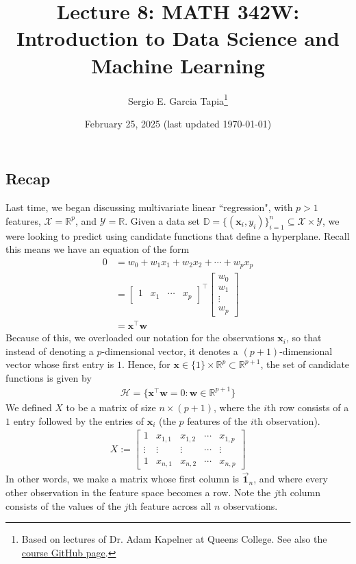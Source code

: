 \documentclass[12pt, a4paper]{article}
\title{Lecture 8: MATH 342W: Introduction to Data Science and Machine Learning}
\author{Sergio E. Garcia Tapia\thanks{Based on lectures of Dr. Adam Kapelner at Queens College.
See also the \href{https://github.com/kapelner/QC_MATH_342W_Spring_2025}{course GitHub page}.}}
\date{February 25, 2025 (last updated \today)}
\theoremstyle{definition}
\begin{document}
	\maketitle
	\subsection*{Recap}
	Last time, we began discussing multivariate linear ``regression", with
	$p>1$ features, $\mathcal{X}=\mathbb{R}^p$, and $\mathcal{Y}=\mathbb{R}$.
	Given a data set $\mathbb{D}=\{(\mathbf{x}_i, y_i)\}_{i=1}^{n}\subseteq \mathcal{X}\times \mathcal{Y}$,
	we were looking to predict using candidate functions that define a hyperplane. Recall this
	means we have an equation of the form
	\begin{align*}
		0&=w_0+w_1x_1+w_2x_2+\cdots+w_px_p\\
		 &= \begin{bmatrix}
			1 & x_1 & \cdots & x_p
		\end{bmatrix}^\top
		\begin{bmatrix}
			w_0 \\
			w_1\\
			\vdots\\
			w_p
		\end{bmatrix}\\
		&= \mathbf{x}^\top \mathbf{w}
	\end{align*}
	Because of this, we overloaded our notation for the observations $\mathbf{x}_i$, so that
	instead of denoting a $p$-dimensional vector, it denotes a $(p+1)$-dimensional vector
	whose first entry is $1$. Hence, for $\mathbf{x}\in \{1\}\times \mathbb{R}^{p}\subset \mathbb{R}^{p+1}$,
	the set of candidate functions is given by
	\begin{align*}
		\mathcal{H} = \{\mathbf{x}^\top \mathbf{w}=0: \mathbf{w}\in\mathbb{R}^{p+1}\}
	\end{align*}
	We defined $X$ to be a matrix of size $n\times (p+1)$, where the $i$th row consists
	of a $1$ entry followed by the entries of $\mathbf{x}_i$ (the $p$ features of the
	$i$th observation).
	\begin{align*}
		X := \begin{bmatrix}
			1 & x_{1,1} & x_{1, 2} & \cdots & x_{1, p}\\
			\vdots & \vdots & \vdots & \cdots & \vdots\\
			1 & x_{n, 1} & x_{n, 2} & \cdots& x_{n, p}
		\end{bmatrix}
	\end{align*}
	In other words, we make a matrix whose first column is $\vec{\mathbf{1}}_n$, and where
	every other observation in the feature space becomes a row. Note the $j$th column
	consists of the values of the $j$th feature across all $n$ observations.
	
\end{document}
